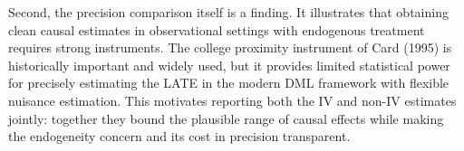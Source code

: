\documentclass[12pt,a4paper]{article}
\begin{document}
Second, the precision comparison itself is a finding.  It illustrates that obtaining
clean causal estimates in observational settings with endogenous treatment requires
strong instruments.  The college proximity instrument of Card (1995) is historically
important and widely used, but it provides limited statistical power for precisely
estimating the LATE in the modern DML framework with flexible nuisance estimation.
This motivates reporting both the IV and non-IV estimates jointly: together they bound
the plausible range of causal effects while making the endogeneity concern and its cost
in precision transparent.



\end{document}
